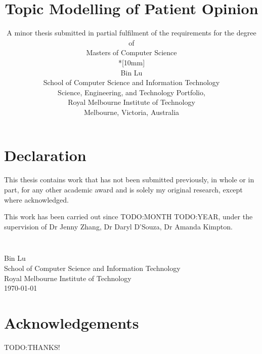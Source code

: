 \documentclass[11pt,twoside]{report}
\newcommand{\SubmissionDate}{\today}
\newcommand{\student}{Bin Lu}
\newcommand{\supervisor}{Dr Jenny Zhang, Dr Daryl D'Souza, Dr Amanda Kimpton}
\newcommand{\topic}{Topic Modelling of Patient Opinion}
\newcommand{\school}{School of Computer Science and Information Technology}
\newcommand{\program}{Masters of Computer Science}
\newcommand{\institution}{Royal Melbourne Institute of Technology}
\begin{document}
\title{{\Large\bf \topic}}
\author{
A minor thesis submitted in partial fulfilment of the requirements for the degree of
\\\program\\*[10mm]
\\\student
\\\school
\\Science, Engineering, and Technology Portfolio,
\\\institution
\\Melbourne, Victoria, Australia
}
\maketitle
\thispagestyle{empty}


\chapter*{Declaration}

This thesis contains work that has not been submitted previously, in
whole or in part, for any other academic award and is solely my
original research, except where acknowledged.

This work has been carried out since TODO:MONTH TODO:YEAR, under the
supervision of {\supervisor}.

\paragraph{}
\vspace{5cm}\noindent \\\student \\
\school\\
\institution\\
\SubmissionDate


\chapter*{Acknowledgements}

TODO:THANKS!

\tableofcontents
\listoffigures
\listoftables

\end{document}
